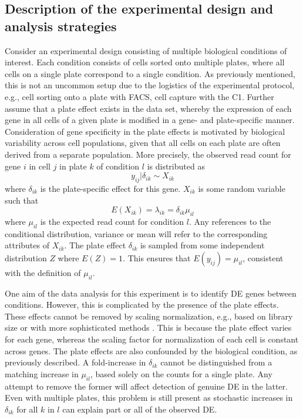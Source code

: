 \documentclass{article}
\begin{document}
\subsection{Description of the experimental design and analysis strategies}
Consider an experimental design consisting of multiple biological conditions of interest.
Each condition consists of cells sorted onto multiple plates, where all cells on a single plate correspond to a single condition.
As previously mentioned, this is not an uncommon setup due to the logistics of the experimental protocol, e.g., cell sorting onto a plate with FACS, cell capture with the C1.
Further assume that a plate effect exists in the data set, whereby the expression of each gene in all cells of a given plate is modified in a gene- and plate-specific manner.
Consideration of gene specificity in the plate effects is motivated by biological variability across cell populations, 
    given that all cells on each plate are often derived from a separate population.
More precisely, the observed read count for gene $i$ in cell $j$ in plate $k$ of condition $l$ is distributed as 
\[
    y_{ij} | \delta_{ik}  \sim X_{ik}
\]
where $\delta_{ik}$ is the plate-specific effect for this gene.
$X_{ik}$ is some random variable such that 
\[
    E(X_{ik}) = \lambda_{ik} = \delta_{ik}\mu_{il}
\]
where $\mu_{il}$ is the expected read count for condition $l$. 
Any references to the conditional distribution, variance or mean will refer to the corresponding attributes of $X_{ik}$.
The plate effect $\delta_{ik}$ is sampled from some independent distribution $Z$ where $E(Z) = 1$.
This ensures that $E(y_{ij}) = \mu_{il}$, consistent with the definition of $\mu_{il}$.

One aim of the data analysis for this experiment is to identify DE genes between conditions.
However, this is complicated by the presence of the plate effects.
These effects cannot be removed by scaling normalization, e.g., based on library size or with more sophisticated methods \cite{anders2010differential,robinson2010scaling}.
This is because the plate effect varies for each gene, whereas the scaling factor for normalization of each cell is constant across genes.
The plate effects are also confounded by the biological condition, as previously described.
A fold-increase in $\delta_{ik}$ cannot be distinguished from a matching increase in $\mu_{il}$, based solely on the counts for a single plate.
Any attempt to remove the former will affect detection of genuine DE in the latter.
Even with multiple plates, this problem is still present as stochastic increases in $\delta_{ik}$ for all $k$ in $l$ can explain part or all of the observed DE.
\end{document}
